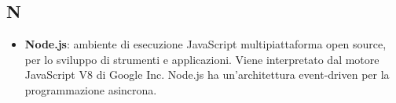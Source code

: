 \subsection{N}
\begin{itemize}
	\item \textbf{Node.js}: ambiente di esecuzione JavaScript multipiattaforma open source, per lo sviluppo di strumenti e applicazioni. Viene interpretato dal motore JavaScript V8 di Google Inc. Node.js ha un'architettura event-driven per la programmazione asincrona.
\end{itemize}
